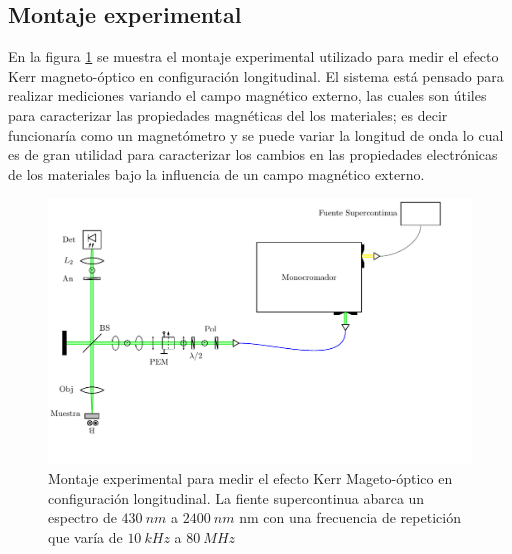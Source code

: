 \subsection{Montaje experimental}\label{Met:subsec:MontExp}
En la figura \ref{Met:fig:kerr} se muestra el montaje experimental utilizado para medir el efecto Kerr magneto-\'optico en configuraci\'on longitudinal. El sistema est\'a pensado para realizar mediciones variando el campo magn\'etico externo, las cuales son \'utiles para caracterizar las propiedades magn\'eticas del los materiales; es decir funcionar\'ia como un magnet\'ometro y se puede variar la longitud de onda lo cual es de gran utilidad para caracterizar los cambios en las propiedades electr\'onicas de los materiales bajo la influencia de un campo magn\'etico externo.
\begin{figure}[!hbt]
	\centering
	\includegraphics[scale=0.67]{figMet/diagrama/diagrama.pdf}
	\caption[Montaje experimental de espectroscop\'ia de efecto kerr magneto-\'optico.]{Montaje experimental para medir el efecto Kerr Mageto-\'optico en configuraci\'on longitudinal. La fiente supercontinua abarca un espectro de $430~nm $ a $2400~nm$ nm con una frecuencia de repetici\'on que var\'ia de $10~kHz $ a $80~MHz$ }
	\label{Met:fig:kerr}
\end{figure}
\newline
